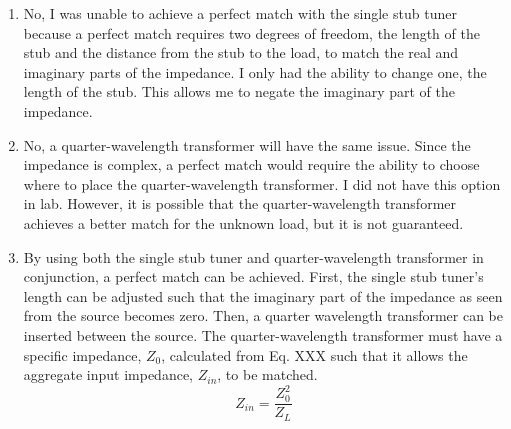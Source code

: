 \documentclass{article}
\begin{document}
\begin{enumerate}
	\item No, I was unable to achieve a perfect match with the single stub tuner because a perfect match requires two degrees of freedom, the length of the stub and the distance from the stub to the load, to match the real and imaginary parts of the impedance. I only had the ability to change one, the length of the stub. This allows me to negate the imaginary part of the impedance.
	\item No, a quarter-wavelength transformer will have the same issue. Since the impedance is complex, a perfect match would require the ability to choose where to place the quarter-wavelength transformer. I did not have this option in lab. However, it is possible that the quarter-wavelength transformer achieves a better match for the unknown load, but it is not guaranteed.
	\item By using both the single stub tuner and quarter-wavelength transformer in conjunction, a perfect match can be achieved. First, the single stub tuner's length can be adjusted such that the imaginary part of the impedance as seen from the source becomes zero. Then, a quarter wavelength transformer can be inserted between the source. The quarter-wavelength transformer must have a specific impedance, $Z_0$, calculated from Eq. XXX such that it allows the aggregate input impedance, $Z_{in}$, to be matched.
	\begin{equation}
		Z_{in} = \dfrac{Z_0^2}{Z_L}
	\end{equation}
\end{enumerate}
\end{document}
